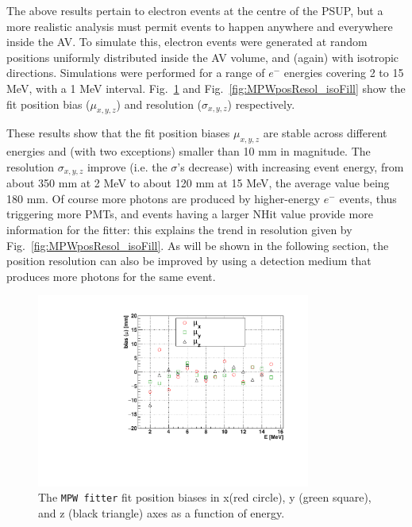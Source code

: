 The above results pertain to electron events at the centre of the PSUP, but a more realistic analysis must permit events to happen anywhere and everywhere inside the AV. To simulate this, electron events were generated at random positions uniformly distributed inside the AV volume, and (again) with isotropic directions. Simulations were performed for a range of $e^-$ energies covering 2 to 15 MeV, with a 1 MeV interval. Fig.~\ref{fig:MPWposBias_isoFill} and Fig.~\ref{fig:MPWposResol_isoFill} show the fit position bias ($\mu_{x,y,z}$) and resolution ($\sigma_{x,y,z}$) respectively. 

These results show that the fit position biases $\mu_{x,y,z}$ are stable across different energies and (with two exceptions) smaller than 10 mm in magnitude. The resolution $\sigma_{x,y,z}$ improve (i.e. the $\sigma$'s decrease) with increasing event energy, from about 350 mm at 2 MeV to about 120 mm at 15 MeV, the average value being 180 mm. Of course more photons are produced by higher-energy $e^-$ events, thus triggering more PMTs, and events having a larger NHit value provide more information for the fitter: this explains the trend in resolution given by Fig.~\ref{fig:MPWposResol_isoFill}. As will be shown in the following section, the position resolution can also be improved by using a detection medium that produces more photons for the same event. 

\begin{figure}[htbp]
	\centering	
	\includegraphics[width=9cm]{MPW_isoFill_posBiasVsE.pdf}
	\caption[The \texttt{MPW fitter} fit position biases ($\mu_{x,y,z}$) as a function of energy.]{The \texttt{MPW fitter} fit position biases in x(red circle), y (green square), and z (black triangle) axes as a function of energy. \label{fig:MPWposBias_isoFill}}
\end{figure}

